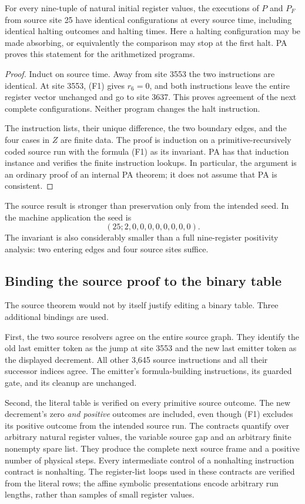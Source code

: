 \begin{theorem}
For every nine-tuple of natural initial register values, the executions
of $P$ and $P_F$ from source site 25 have identical configurations at
every source time, including identical halting outcomes and halting times.
Here a halting configuration may be made absorbing, or equivalently the
comparison may stop at the first halt. PA proves this statement for the
arithmetized programs.
\end{theorem}
\begin{proof}
Induct on source time. Away from site 3553 the two instructions are
identical. At site 3553, (F1) gives $r_6=0$, and both instructions leave
the entire register vector unchanged and go to site 3637. This proves
agreement of the next complete configurations. Neither program changes
the halt instruction.

The instruction lists, their unique difference, the two boundary edges,
and the four cases in $Z$ are finite data. The proof is induction on a
primitive-recursively coded source run with the formula (F1) as its
invariant. PA has that induction instance and verifies the finite
instruction lookups. In particular, the argument is an ordinary proof
of an internal PA theorem; it does not assume that PA is consistent.
\end{proof}

The source result is stronger than preservation only from the intended
seed. In the machine application the seed is
\[
                   (25;2,0,0,0,0,0,0,0,0).
\]
The invariant is also considerably smaller than a full nine-register
positivity analysis: two entering edges and four source sites suffice.

\subsection{Binding the source proof to the binary table}

The source theorem would not by itself justify editing a binary table.
Three additional bindings are used.

First, the two source resolvers agree on the entire source graph. They
identify the old last emitter token as the jump at site 3553 and the new
last emitter token as the displayed decrement. All other 3,645 source
instructions and all their successor indices agree. The emitter's
formula-building instructions, its guarded gate, and its cleanup are
unchanged.

Second, the literal table is verified on every primitive source outcome.
The new decrement's zero \emph{and positive} outcomes are included, even
though (F1) excludes its positive outcome from the intended source run.
The contracts quantify over arbitrary natural register values, the
variable source gap and an arbitrary finite nonempty spare list. They
produce the complete next source frame and a positive number of physical
steps. Every intermediate control of a nonhalting instruction contract
is nonhalting. The register-list loops used in these contracts are
verified from the literal rows; the affine symbolic presentations encode
arbitrary run lengths, rather than samples of small register values.

